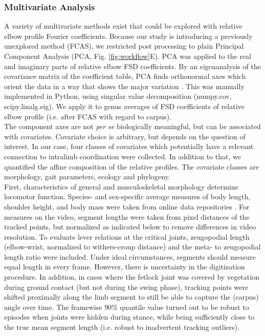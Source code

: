 \subsubsection{Multivariate Analysis}
A variety of multivariate methods exist that could be explored with relative elbow profile Fourier coefficients.
Because our study is introducing a previously unexplored method (FCAS), we restricted post processing to plain Principal Component Analysis (PCA, Fig. \ref{fig:workflow}E).
PCA was applied to the real and imaginary parts of relative elbow FSD coefficients.
By an eigenanalysis of the covariance matrix of the coefficient table, PCA finds orthonormal axes which orient the data in a way that shows the major variation \cite[\textit{cf.}][]{MacLeod2007}.
This was manually implemented in Python, using singular value decomposition (\textsf{numpy.cov}, \textsf{scipy.linalg.eig}).
We apply it to genus averages \citep{Mitteroecker2011} of FSD coefficients of relative elbow profile (i.e. after FCAS with regard to carpus).
\\The component axes are not \textit{per se} biologically meaningful, but can be associated with covariates.
Covariate choice is arbitrary, but depends on the question of interest.
In our case, four classes of covariates which potentially have a relevant connection to intralimb coordination were collected.
In addition to that, we quantified the affine composition of the relative profiles.
The covariate classes are morphology, gait parameters, ecology and phylogeny.
\\First, characteristics of general and musculoskeletal morphology determine locomotor function.
Species- and sex-specific average measures of body length, shoulder height, and body mass were taken from online data repositories \citep{UltimateUngulate,AnimalDiversityWeb}.
For measures on the video, segment lengths were taken from pixel distances of the tracked points, but normalized as indicated below to remove differences in video resolution.
To evaluate lever relations at the critical joints, zeugopodial length (elbow-wrist, normalized to withers-croup distance) and the meta- to zeugopodial length ratio were included.
Under ideal circumstances, segments should measure equal length in every frame.
However, there is uncertainty in the digitization procedure.
In addition, in cases where the fetlock joint was covered by vegetation during ground contact (but not during the swing phase), tracking points were shifted proximally along the limb segment to still be able to capture the (carpus) angle over time.
The framewise $90\%$ quantile value turned out to be robust to episodes when joints were hidden during stance, while being sufficiently close to the true mean segment length (i.e. robust to inadvertent tracking outliers).

